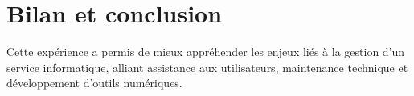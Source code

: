 \section{Bilan et conclusion}
Cette expérience a permis de mieux appréhender les enjeux liés à la gestion d’un service informatique, alliant assistance aux utilisateurs, maintenance technique et développement d’outils numériques.

\clearpage
